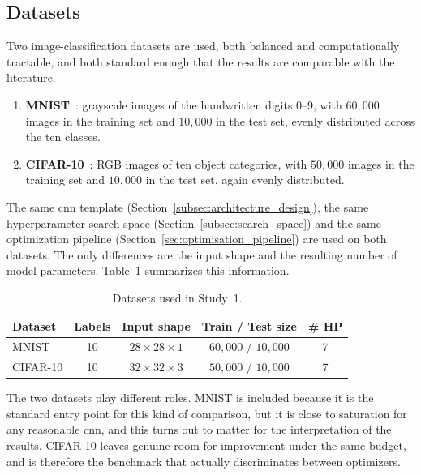 \subsection{Datasets}
\label{subsec:datasets}

Two image-classification datasets are used, both balanced and computationally tractable, and both standard enough that the results are comparable with the literature.

\begin{enumerate}
    \item \textbf{MNIST}~\cite{lecun1998mnist}: grayscale images of the handwritten digits 0--9, with $60{,}000$ images in the training set and $10{,}000$ in the test set, evenly distributed across the ten classes.
    \item \textbf{CIFAR-10}~\cite{krizhevsky2009cifar}: RGB images of ten object categories, with $50{,}000$ images in the training set and $10{,}000$ in the test set, again evenly distributed.
\end{enumerate}

The same \acrshort{cnn} template (Section~\ref{subsec:architecture_design}), the same hyperparameter search space (Section~\ref{subsec:search_space}) and the same optimization pipeline (Section~\ref{sec:optimisation_pipeline}) are used on both datasets. The only differences are the input shape and the resulting number of model parameters. Table~\ref{tab:datasets} summarizes this information.

\begin{table}[h]
    \centering
    \caption{Datasets used in Study~1.}
    \label{tab:datasets}
    \begin{tabular}{lcccc}
        \toprule
        \textbf{Dataset} & \textbf{Labels} & \textbf{Input shape} & \textbf{Train / Test size} & \textbf{\# HP} \\
        \midrule
        MNIST    & 10 & $28\times28\times1$ & $60{,}000$ / $10{,}000$ & 7 \\
        CIFAR-10 & 10 & $32\times32\times3$ & $50{,}000$ / $10{,}000$ & 7 \\
        \bottomrule
    \end{tabular}
\end{table}

The two datasets play different roles. MNIST is included because it is the standard entry point for this kind of comparison, but it is close to saturation for any reasonable \acrshort{cnn}, and this turns out to matter for the interpretation of the results. CIFAR-10 leaves genuine room for improvement under the same budget, and is therefore the benchmark that actually discriminates between optimizers.

